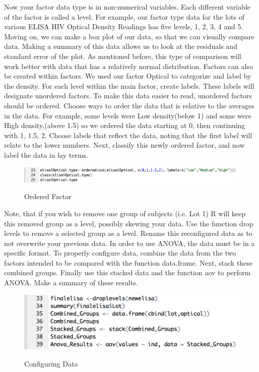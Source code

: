 Now your factor data type is in non-numerical variables.
Each different variable of the factor is called a level.
For example, our factor type data for the lots of various ELISA HIV Optical Density Readings has five levels, 1, 2, 3, 4 and 5.
Moving on, we can make a box plot of our data, so that we can visually compare data.
Making a summary of this data allows us to look at the residuals and standard error of the plot.
As mentioned before, this type of comparison will work better with data that has a relatively normal distribution. 
Factors can also be created within factors.
We used our factor Optical to categorize and label by the density.
For each level within the main factor, create labels.
These labels will designate unordered factors.
To make this data easier to read, unordered factors should be ordered.
Choose ways to order the data that is relative to the averages in the data.
For example, some levels were Low density(below 1) and some were High density,(above 1.5) so we ordered the data starting at 0, then continuing with 1, 1.5, 2. Choose labels that reflect the data, noting that the first label will relate to the lower numbers.
Next, classify this newly ordered factor, and now label the data in lay terms. 
\begin{figure}[H] %
        \centering
        \caption{Ordered Factor}
        \includegraphics[scale=0.5]{pictures/ordered1.png} 
        \label{fig:ordered}
\end{figure}
Note, that if you wish to remove one group of subjects (i.e. Lot 1) R will keep this removed group as a level, possibly skewing your data. Use the function drop levels to remove a selected group as a level. Rename this reconfigured data as to not overwrite your previous data. 
In order to use ANOVA, the data must be in a specific format. To properly configure data, combine the data from the two factors intended to be compared with the function data.frame. Next, stack these combined groups. Finally use this stacked data and the function aov to perform ANOVA. Make a summary of these results.
\begin{figure}[H] %
        \centering
        \caption{Configuring Data}
        \includegraphics[scale=0.5]{pictures/stacked} 
        \label{fig:stacked}
\end{figure}

